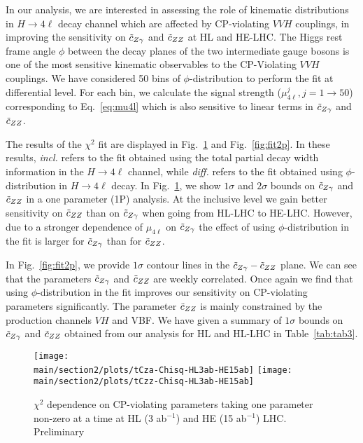 {
In our analysis, we are interested in assessing the role of kinematic distributions in $H \to 4\ell$ decay channel 
which are affected by CP-violating $VVH$ couplings, in improving the sensitivity on $\tilde c_{Z\gamma}$ and $\tilde c_{ZZ}$ at HL and HE-LHC.
The Higgs rest frame angle $\phi$ between the decay planes of the two intermediate gauge bosons  
is one of the most sensitive kinematic observables to the CP-Violating $VVH$ couplings. We have considered 50 bins of $\phi$-distribution to perform the fit at differential level. For each bin, we calculate the signal strength ($\mu_{4\ell}^j, j=1\to50$) corresponding 
to Eq.~\ref{eq:mu4l} which is also sensitive to linear terms in $\tilde c_{Z\gamma}$ and $\tilde c_{ZZ}$.


The results of the $\chi^2$ fit are displayed in Fig.~\ref{fig:fit1p} and Fig.~\ref{fig:fit2p}. In these results, 
 {\it incl.} refers to the fit obtained using 
the total partial decay width information in the $H \to 4\ell$ channel, while {\it diff.} refers to the fit obtained using 
$\phi$-distribution in $H \to 4\ell$ decay. In Fig.~\ref{fig:fit1p}, we show 
$1\sigma$ and $2\sigma$ bounds on $\tilde c_{Z\gamma}$ and $\tilde c_{ZZ}$ in a one parameter (1P) 
analysis.  At the inclusive level 
we gain better sensitivity on $\tilde c_{ZZ}$ than on $\tilde c_{Z\gamma}$ when going from HL-LHC 
to HE-LHC. However, due to a stronger dependence of $\mu_{4\ell}$ on $\tilde c_{Z\gamma}$ the effect of using $\phi$-distribution in the fit is larger for $\tilde c_{Z\gamma}$ than for 
$\tilde c_{ZZ}$.

In Fig.~\ref{fig:fit2p}, we provide $1\sigma$ contour lines in the $\tilde c_{Z\gamma}-\tilde c_{ZZ}$ plane. We can see that the parameters $\tilde c_{Z\gamma}$ and $\tilde c_{ZZ}$ are weekly correlated. 
Once again we find that using $\phi$-distribution in the fit improves our 
sensitivity on CP-violating parameters significantly.
The parameter $\tilde c_{ZZ}$ is mainly constrained by the production channels $VH$ and VBF.
We have given a summary of $1\sigma$ bounds on $\tilde c_{Z\gamma}$ and $\tilde c_{ZZ}$ obtained from our analysis for HL and HL-LHC in Table~\ref{tab:tab3}.
}



\begin{figure}[h!]
\centering
 \texttt{[image: \\main/section2/plots/tCza-Chisq-HL3ab-HE15ab]}
\texttt{[image: \\main/section2/plots/tCzz-Chisq-HL3ab-HE15ab]}
\caption{$\chi^2$ dependence on CP-violating parameters taking one parameter non-zero at a time 
at HL (3 ab$^{-1}$) and HE (15 ab$^{-1}$) LHC. {\cred Preliminary} }\label{fig:fit1p}
\end{figure}

